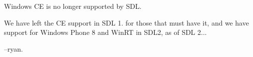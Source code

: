 Windows CE is no longer supported by S\+DL.

We have left the CE support in S\+DL 1. for those that must have it, and we have support for Windows Phone 8 and Win\+RT in S\+D\+L2, as of S\+DL 2...

--ryan. 